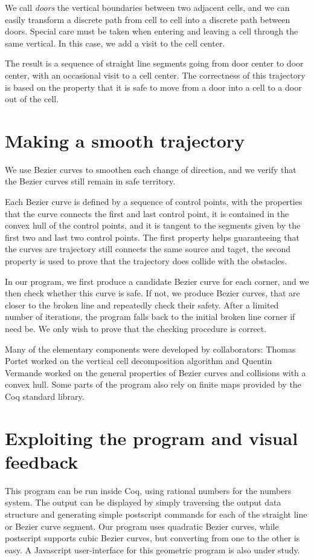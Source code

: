 \documentclass{easychair}
\begin{document}
We call {\em doors} the vertical boundaries between two
adjacent cells, and we can easily transform a discrete path from cell to cell into a discrete
path between doors.  Special care must be taken when entering and leaving a cell
through the same vertical.  In this case, we add a visit to the cell center.

The result is a sequence of straight line segments going from
door center to door center, with an occasional visit to a cell center.
The correctness of this trajectory is based on the property that it is
safe to move from a door into a cell to a door out of the cell.
\section{Making a smooth trajectory}
We use Bezier curves to smoothen each change of direction, and we verify that
the Bezier curves still remain in safe territory.

Each Bezier curve is defined by a sequence of control points, with the properties that 
the curve connects the first and last control point, it is contained in the convex hull
of the control points, and it is tangent to the segments
given by the first two and last two control points.  The first property helps guaranteeing
that the curves are trajectory still connects the same source and taget, the second property
is used to prove that the trajectory does collide with the obstacles.

In our program, we first produce a candidate Bezier curve for each corner, and
we then check whether this curve is safe.  If not, we produce Bezier curves,
that are closer to the broken line and repeatedly check their safety.  After a limited number
of iterations, the program falls back to the initial broken line corner if need be.
We only wish to prove that the checking procedure is correct.

Many of the elementary components were developed by collaborators: Thomas Portet
worked on the vertical cell decomposition algorithm and Quentin Vermande worked on
the general properties of Bezier curves and collisions with a convex hull.  Some
parts of the program also rely on finite maps provided by the Coq standard library.

\section{Exploiting the program and visual feedback}
This program can be run inside Coq, using rational numbers for the numbers system.
The output can be displayed by simply traversing the output data structure and generating
simple postscript commands for each of the straight line or Bezier curve segment.  Our
program uses quadratic Bezier curves, while postscript supports cubic Bezier curves, but
converting from one to the other is easy.  A Javascript user-interface for this geometric
program is also under study.
\end{document}
